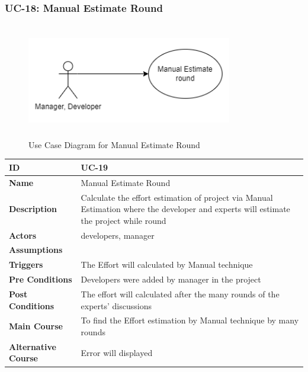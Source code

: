     \subsubsection{UC-18: Manual Estimate Round}
    \begin{figure}[H]
        \includegraphics[height=5cm, width=0.8\textwidth]{./diagrams/Use Case/u18.png}
        \centering 
        \caption{Use Case Diagram for Manual Estimate Round}
        \label{fig:Usecase1}
        \end{figure}
        
    \begin{center}
        \begin{tabularx}{\textwidth}{|l|X|}
            \hline
            \textbf{ID} & UC-19 \\
            \hline
            \textbf{Name} & Manual Estimate Round \\
            \hline
            \textbf{Description} & Calculate the effort estimation of project via Manual Estimation where the developer and experts will estimate the project while round \\
            \hline
            \textbf{Actors} & developers, manager \\
            \hline
            \textbf{Assumptions} &  \\
            \hline
            \textbf{Triggers} & The Effort will calculated by Manual technique \\
            \hline
            \textbf{Pre Conditions} & Developers were added by manager  in the project \\
            \hline
            \textbf{Post Conditions} & The effort will calculated after the many rounds of the experts' discussions  \\
            \hline
            \textbf{Main Course} & To find the Effort estimation by Manual technique by many rounds \\
            \hline
            \textbf{Alternative Course} & Error will displayed \\
            \hline
            
        \end{tabularx}
    \end{center}
    
